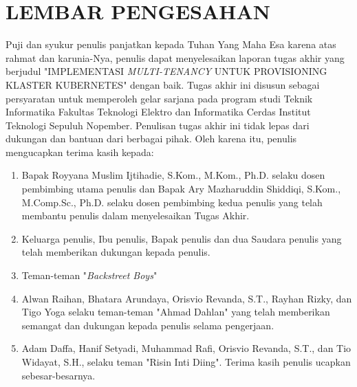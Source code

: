 \chapter*{LEMBAR PENGESAHAN}


\vspace{2ex}


Puji dan syukur penulis panjatkan kepada Tuhan Yang Maha Esa karena atas rahmat
dan karunia-Nya, penulis dapat menyelesaikan laporan tugas akhir yang berjudul
"IMPLEMENTASI \emph{MULTI-TENANCY} UNTUK PROVISIONING KLASTER KUBERNETES" dengan
baik. Tugas akhir ini disusun sebagai persyaratan untuk memperoleh gelar sarjana
pada program studi Teknik Informatika Fakultas Teknologi Elektro dan Informatika
Cerdas Institut Teknologi Sepuluh Nopember. Penulisan tugas akhir ini tidak lepas
dari dukungan dan bantuan dari berbagai pihak.
Oleh karena itu, penulis mengucapkan terima kasih kepada:

\begin{enumerate}[nolistsep]

  \item Bapak Royyana Muslim Ijtihadie, S.Kom., M.Kom., Ph.D. selaku dosen pembimbing
    utama penulis dan Bapak Ary Mazharuddin Shiddiqi, S.Kom., M.Comp.Sc., Ph.D. selaku dosen
    pembimbing kedua penulis yang telah membantu penulis dalam menyelesaikan Tugas Akhir.

  \item Keluarga penulis, Ibu penulis, Bapak penulis dan dua Saudara penulis yang telah 
    memberikan dukungan kepada penulis. \lipsum[3][1-2]

  \item Teman-teman "\emph{Backstreet Boys}"
    
  \item Alwan Raihan, Bhatara Arundaya, Orisvio Revanda, S.T., Rayhan Rizky, dan Tigo Yoga
    selaku teman-teman "Ahmad Dahlan" yang telah memberikan semangat dan dukungan kepada
    penulis selama pengerjaan.

  \item Adam Daffa, Hanif Setyadi, Muhammad Rafi, Orisvio Revanda, S.T., dan Tio
    Widayat, S.H., selaku teman "Risin Inti Diing". Terima kasih penulis ucapkan
    sebesar-besarnya.

\end{enumerate}

